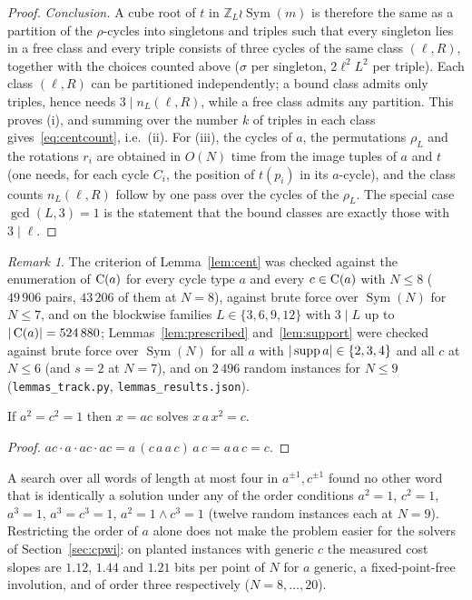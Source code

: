 \documentclass[preprint,12pt]{elsarticle}
\theoremstyle{definition}\newtheorem{defi}[thm]{Definition}\newtheorem{prob}[thm]{Problem}\newtheorem{obs}[thm]{Observation}
\theoremstyle{remark}\newtheorem{rem}[thm]{Remark}
\newcommand{\ZZ}{\mathbb Z}\newcommand{\Sym}{\operatorname{Sym}}\newcommand{\Alt}{\operatorname{Alt}}
\begin{document}
\begin{proof}
\emph{Conclusion.} A cube root of $t$ in $\ZZ_L\wr\Sym(m)$ is therefore the same as a partition of the $\rho$-cycles into singletons and triples such that every singleton lies in a free class and every triple consists of three cycles of the same class $(\ell,R)$, together with the choices counted above ($\sigma$ per singleton, $2\ell^{2}L^{2}$ per triple). Each class $(\ell,R)$ can be partitioned independently; a bound class admits only triples, hence needs $3\mid n_L(\ell,R)$, while a free class admits any partition. This proves (i), and summing over the number $k$ of triples in each class gives~\eqref{eq:centcount}, i.e.\ (ii). For (iii), the cycles of $a$, the permutations $\rho_L$ and the rotations $r_i$ are obtained in $O(N)$ time from the image tuples of $a$ and $t$ (one needs, for each cycle $C_i$, the position of $t(p_i)$ in its $a$-cycle), and the class counts $n_L(\ell,R)$ follow by one pass over the cycles of the $\rho_L$. The special case $\gcd(L,3)=1$ is the statement that the bound classes are exactly those with $3\mid\ell$.
\end{proof}
\begin{rem}
The criterion of Lemma~\ref{lem:cent} was checked against the enumeration of $\operatorname{C}(a)$ for every cycle type $a$ and every $c\in\operatorname{C}(a)$ with $N\le8$ ($49\,906$ pairs, $43\,206$ of them at $N=8$), against brute force over $\Sym(N)$ for $N\le7$, and on the blockwise families $L\in\{3,6,9,12\}$ with $3\mid L$ up to $|\operatorname{C}(a)|=524\,880$; Lemmas~\ref{lem:prescribed} and~\ref{lem:support} were checked against brute force over $\Sym(N)$ for all $a$ with $|\operatorname{supp} a|\in\{2,3,4\}$ and all $c$ at $N\le6$ (and $s=2$ at $N=7$), and on $2\,496$ random instances for $N\le9$ (\texttt{lemmas\_track.py}, \texttt{lemmas\_results.json}).
\end{rem}

\begin{lem}\label{lem:inv}
If $a^{2}=c^{2}=1$ then $x=ac$ solves $x\,a\,x^{2}=c$.
\end{lem}
\begin{proof}
$ac\cdot a\cdot ac\cdot ac=a\,(c\,a\,a\,c)\,a\,c=a\,a\,c=c$.
\end{proof}
A search over all words of length at most four in $a^{\pm1},c^{\pm1}$ found no other word that is identically a solution under any of the order conditions $a^{2}=1$, $c^{2}=1$, $a^{3}=1$, $a^{3}=c^{3}=1$, $a^{2}=1\wedge c^{3}=1$ (twelve random instances each at $N=9$). Restricting the order of $a$ alone does not make the problem easier for the solvers of Section~\ref{sec:cpwi}: on planted instances with generic $c$ the measured cost slopes are $1.12$, $1.44$ and $1.21$ bits per point of $N$ for $a$ generic, a fixed-point-free involution, and of order three respectively ($N=8,\ldots,20$).
\end{document}
